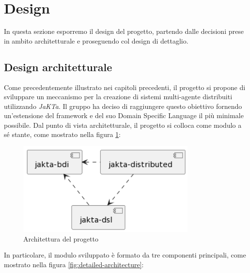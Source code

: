 \section{Design}




In questa sezione esporremo il design del progetto, partendo dalle decisioni prese in ambito architetturale e proseguendo
col design di dettaglio.

\subsection{Design architetturale}
Come precedentemente illustrato nei capitoli precedenti, il progetto si propone di sviluppare un meccanismo per la creazione di sistemi multi-agente distribuiti utilizzando \textit{JaKTa}.
Il gruppo ha deciso di raggiungere questo obiettivo fornendo un'estensione del framework e del suo Domain Specific Language il più minimale possibile.
Dal punto di vista architetturale, il progetto si colloca come modulo a sé stante, come mostrato nella figura \ref{fig:architecture}:

\begin{figure}[ht]
    \centering
    \includegraphics[width=0.8\textwidth]{figures/general-architecture.png}
    \caption{Architettura del progetto}
    \label{fig:architecture}
\end{figure}

In particolare, il modulo sviluppato è formato da tre componenti principali, come mostrato nella figura \ref{fig:detailed-architecture}:


